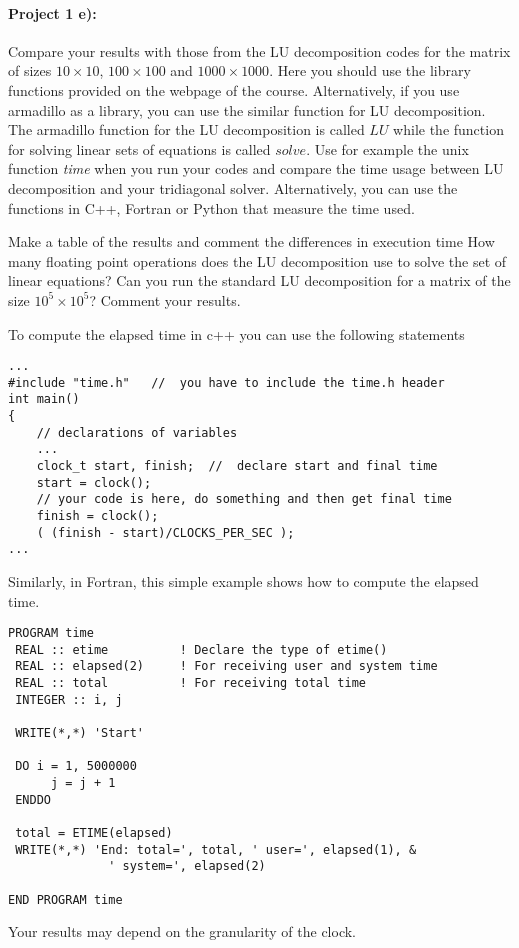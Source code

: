 \documentclass[%
oneside,                 %
final,                   %
10pt]{article}
\begin{document}
\paragraph{Project 1 e):}
Compare your results with those from the LU decomposition codes for the matrix of sizes $10\times 10$, $100\times 100$ and
$1000\times 1000$. Here you should use the library functions provided  on the webpage of the course. Alternatively, if you use armadillo as a library, you can use the similar function for LU decomposition.  The armadillo function for the LU decomposition is called $LU$ while the function for solving linear sets of equations is called $solve$.
Use for example the unix function \emph{time} when you run your codes 
and compare the time usage between LU decomposition and  your
tridiagonal solver.   Alternatively, you can use the functions in C++, Fortran or Python that measure the time used. 

Make a table of the results and comment the differences
in execution time
How many floating point operations does the LU decomposition use to solve the set of linear equations?
Can you run the standard LU decomposition
for a matrix of the size $10^5\times 10^5$?
Comment your results.


To compute the elapsed time in c++ you can use the following statements
\begin{verbatim}
...
#include "time.h"   //  you have to include the time.h header
int main()
{
    // declarations of variables 
    ...
    clock_t start, finish;  //  declare start and final time
    start = clock();
    // your code is here, do something and then get final time
    finish = clock();
    ( (finish - start)/CLOCKS_PER_SEC );
...
\end{verbatim}
Similarly, in Fortran, this simple example shows how to compute the elapsed time.
\begin{verbatim}
PROGRAM time
 REAL :: etime          ! Declare the type of etime()
 REAL :: elapsed(2)     ! For receiving user and system time
 REAL :: total          ! For receiving total time
 INTEGER :: i, j

 WRITE(*,*) 'Start'

 DO i = 1, 5000000  
      j = j + 1
 ENDDO

 total = ETIME(elapsed)
 WRITE(*,*) 'End: total=', total, ' user=', elapsed(1), &
              ' system=', elapsed(2)

END PROGRAM time
\end{verbatim}

Your results may depend on the granularity of the clock.
\end{document}
